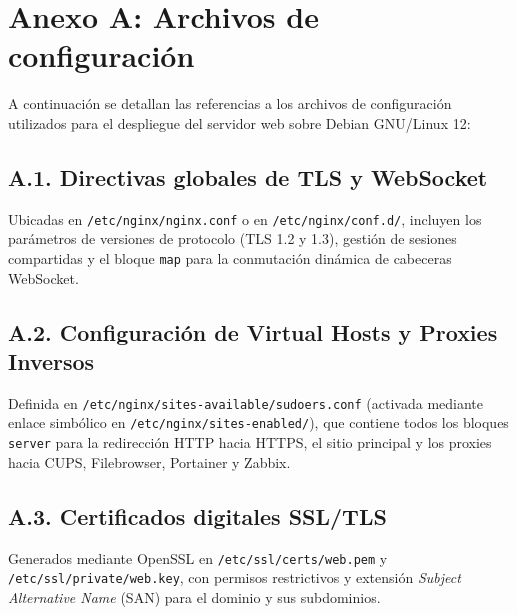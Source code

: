 

\section*{Anexo A: Archivos de configuración}

A continuación se detallan las referencias a los archivos de configuración
utilizados para el despliegue del servidor web sobre Debian GNU/Linux 12:

\subsection*{A.1. Directivas globales de TLS y WebSocket}

Ubicadas en \texttt{/etc/nginx/nginx.conf} o en \texttt{/etc/nginx/conf.d/},
incluyen los parámetros de versiones de protocolo (TLS 1.2 y 1.3), gestión de
sesiones compartidas y el bloque \texttt{map} para la conmutación dinámica de
cabeceras WebSocket.

\subsection*{A.2. Configuración de Virtual Hosts y Proxies Inversos}

Definida en \texttt{/etc/nginx/sites-available/sudoers.conf} (activada mediante
enlace simbólico en \texttt{/etc/nginx/sites-enabled/}), que contiene todos los
bloques \texttt{server} para la redirección HTTP hacia HTTPS, el sitio principal
y los proxies hacia CUPS, Filebrowser, Portainer y Zabbix.

\subsection*{A.3. Certificados digitales SSL/TLS}

Generados mediante OpenSSL en \texttt{/etc/ssl/certs/web.pem} y
\texttt{/etc/ssl/private/web.key}, con permisos restrictivos y extensión
\textit{Subject Alternative Name} (SAN) para el dominio y sus subdominios.
